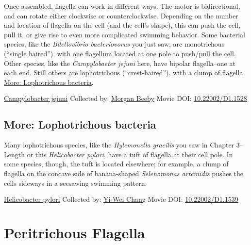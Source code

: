 \documentclass[]{tufte-book}
\begin{document}
Once assembled, flagella can work in different ways. The motor is bidirectional, and can rotate either clockwise or counterclockwise. Depending on the number and location of flagella on the cell (and the cell's shape), this can push the cell, pull it, or give rise to even more complicated swimming behavior. Some bacterial species, like the \emph{Bdellovibrio bacteriovorus} you just saw, are monotrichous (``single haired''), with one flagellum located at one pole to push/pull the cell. Other species, like the \emph{Campylobacter jejuni} here, have bipolar flagella--one at each end. Still others are lophotrichous (``crest-haired''), with a clump of flagella \protect\hyperlink{Lophotrichous_bacteria}{More: Lophotrichous bacteria}.



\hypertarget{htmlwidget-f94b303aadd05d73d901}{}

\label{fig:6-4}\protect\hyperlink{tree}{Campylobacter jejuni} Collected by: \protect\hyperlink{morgan_beeby}{Morgan Beeby} Movie DOI: \href{https://doi.org/10.22002/D1.1528}{10.22002/D1.1528}

\hypertarget{Lophotrichous_bacteria}{%
\subsection*{More: Lophotrichous bacteria}\label{Lophotrichous_bacteria}}

Many lophotrichous species, like the \emph{Hylemonella gracilis} you saw in Chapter 3--Length or this \emph{Helicobacter pylori}, have a tuft of flagella at their cell pole. In some species, though, the tuft is located elsewhere; for example, a clump of flagella on the concave side of banana-shaped \emph{Selenomonas artemidis} pushes the cells sideways in a seesawing swimming pattern.



\hypertarget{htmlwidget-3f66915aec12e91a0c27}{}

\label{fig:6-4a}\protect\hyperlink{tree}{Helicobacter pylori} Collected by: \protect\hyperlink{yi-wei_chang}{Yi-Wei Chang} Movie DOI: \href{https://doi.org/10.22002/D1.1539}{10.22002/D1.1539}

\hypertarget{peritrichous-flagella}{%
\section{Peritrichous Flagella}\label{peritrichous-flagella}}
\end{document}

